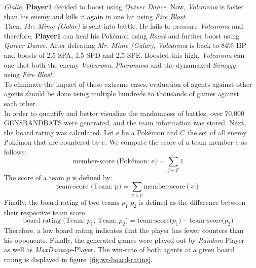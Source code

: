 \textit{Glalie}, \textbf{Player1} decided to boost using \textit{Quiver Dance}. Now, \textit{Volcarona}
is faster than his enemy and kills it again in one hit using \textit{Fire Blast}. \\
Then, \textit{Mr. Mime (Galar)} is sent into battle. He fails to pressure \textit{Volcarona} and therefore,
\textbf{Player1} can heal his Pokémon using \textit{Roost} and further boost using \textit{Quiver Dance}. After
defeating \textit{Mr. Mime (Galar)}, \textit{Volcarona} is back to 84\% HP and boosts of 2.5 \ac{SPA},
1.5 \ac{SPD} and 2.5 \ac{SPE}. 
Boosted this high, \textit{Volcarona} can one-shot both the enemy \textit{Volcarona},
\textit{Pheromosa} and the dynamaxed \textit{Scraggy} using \textit{Fire Blast}. \\
To eliminate the impact of these extreme cases, evaluation of agents against other agents 
should be done using multiple hundreds to thousands of games against each other. \\
In order to quantify and better visualize the randomness of battles, over 70,000 \ac{GEN8RANDBATS}
were generated, and the team information was stored. Next, the board rating was calculated. Let $e$ be 
a Pokémon and $C$ the set of all enemy Pokémon that are countered by $e$. We compute the score of 
a team member $e$ as follows: 
\begin{equation}
  \text{member-score (Pokémon: e)} = \sum_{j \in C} 1
\end{equation}
The score of a team $p$ is defined by:
\begin{equation} 
  \text{team-score (Team: p)} = \sum_{e \in p} \text{member-score}(e)
\end{equation}
Finally, the board rating of two teams $p_1$ $p_2$ is defined as the difference between their respective 
team score
\begin{equation}
  \text{board rating (Team: $p_1$, Team: $p_2$)} = \text{team-score($p_1$)} - \text{team-score($p_2$)}
\end{equation}
Therefore, a low board rating indicates that the player has fewer counters than his opponents. Finally,
the generated games were played out by \textit{Random}-Player as well as \textit{MaxDamage}-Player. The 
win-rate of both agents at a given board rating is displayed in figure~\ref{fig:wr-board-rating}. 
